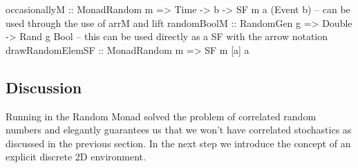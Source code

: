 \begin{HaskellCode}
occasionallyM :: MonadRandom m => Time -> b -> SF m a (Event b)
-- can be used through the use of arrM and lift
randomBoolM :: RandomGen g => Double -> Rand g Bool
-- this can be used directly as a SF with the arrow notation
drawRandomElemSF :: MonadRandom m => SF m [a] a
\end{HaskellCode}

\subsection{Discussion} 
Running in the Random Monad solved the problem of correlated random numbers and elegantly guarantees us that we won't have correlated stochastics as discussed in the previous section. In the next step we introduce the concept of an explicit discrete 2D environment.